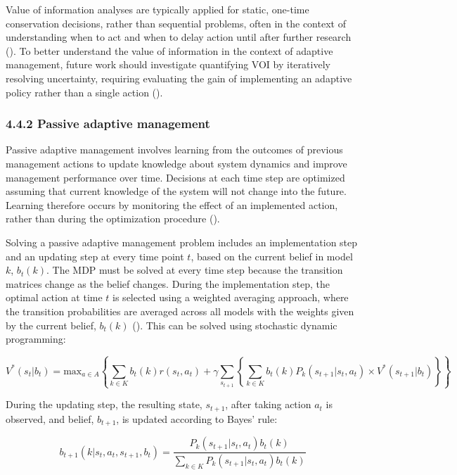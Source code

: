 \documentclass[
  11pt,
  a4paper,
]{article}
\begin{document}
Value of information analyses are typically applied for static, one-time conservation decisions, rather than sequential problems, often in the context of understanding when to act and when to delay action until after further research (). To better understand the value of information in the context of adaptive management, future work should investigate quantifying VOI by iteratively resolving uncertainty, requiring evaluating the gain of implementing an adaptive policy rather than a single action ().

\subsubsection{4.4.2 Passive adaptive management}\label{passive-adaptive-management}

Passive adaptive management involves learning from the outcomes of previous management actions to update knowledge about system dynamics and improve management performance over time. Decisions at each time step are optimized assuming that current knowledge of the system will not change into the future. Learning therefore occurs by monitoring the effect of an implemented action, rather than during the optimization procedure ().

Solving a passive adaptive management problem includes an implementation step and an updating step at every time point \(t\), based on the current belief in model \(k\), \(b_t(k)\). The MDP must be solved at every time step because the transition matrices change as the belief changes. During the implementation step, the optimal action at time \(t\) is selected using a weighted averaging approach, where the transition probabilities are averaged across all models with the weights given by the current belief, \(b_t(k)\) (). This can be solved using stochastic dynamic programming:

\[
V^*(s_t|b_t) = \text{max}_{a \in A} \left\{ \sum_{k \in K}b_t(k)r(s_t, a_t) + \gamma \sum_{s_{t+1}} \left\{\sum_{k\in K}b_t(k)P_k(s_{t+1}|s_t, a_t) \times V^*(s_{t+1}|b_t)\right\} \right\}
\]

During the updating step, the resulting state, \(s_{t+1}\), after taking action \(a_t\) is observed, and belief, \(b_{t+1}\), is updated according to Bayes' rule:

\[
b_{t+1}(k|s_t, a_t, s_{t+1}, b_t) = \frac{P_k(s_{t+1}|s_t,a_t)b_t(k)}{\sum_{k \in K}P_k(s_{t+1}|s_t,a_t)b_t(k)}
\]
\end{document}
